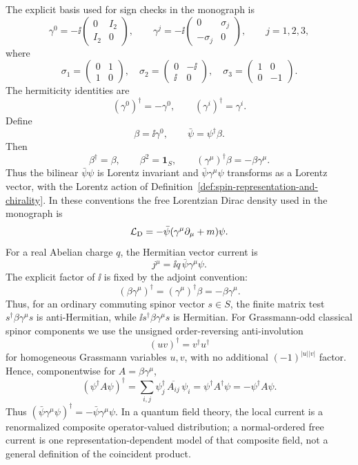 \begin{definition}
The explicit basis used for sign checks in the monograph is
\begin{equation}
  \gamma^0
  =
  -\ii
  \begin{pmatrix}
    0&I_2\\ I_2&0
  \end{pmatrix},
  \qquad
  \gamma^j
  =
  -\ii
  \begin{pmatrix}
    0&\sigma_j\\ -\sigma_j&0
  \end{pmatrix},
  \qquad j=1,2,3,
  \label{eq:appendix-weinberg-gamma-basis}
\end{equation}
where
\[
  \sigma_1=\begin{pmatrix}0&1\\1&0\end{pmatrix},
  \quad
  \sigma_2=\begin{pmatrix}0&-\ii\\ \ii&0\end{pmatrix},
  \quad
  \sigma_3=\begin{pmatrix}1&0\\0&-1\end{pmatrix}.
\]
The hermiticity identities are
\[
  (\gamma^0)^\dagger=-\gamma^0,
  \qquad
  (\gamma^i)^\dagger=\gamma^i .
\]
Define
\begin{equation}
  \beta=\ii\gamma^0,
  \qquad
  \bar\psi=\psi^\dagger\beta .
  \label{eq:appendix-dirac-adjoint}
\end{equation}
Then
\[
  \beta^\dagger=\beta,
  \qquad
  \beta^2=\mathbf 1_S,
  \qquad
  (\gamma^\mu)^\dagger\beta=-\beta\gamma^\mu .
\]
Thus the bilinear \(\bar\psi\psi\) is Lorentz invariant and
\(\bar\psi\gamma^\mu\psi\) transforms as a Lorentz vector, with the Lorentz
action of Definition~\ref{def:spin-representation-and-chirality}.  In these
conventions the free Lorentzian Dirac density used in the monograph is
\[
  \mathcal L_{\rm D}=-\bar\psi(\gamma^\mu\partial_\mu+m)\psi .
\]
For a real Abelian charge \(q\), the Hermitian vector current is
\[
  j^\mu=\ii q\,\bar\psi\gamma^\mu\psi .
\]
The explicit factor of \(\ii\) is fixed by the adjoint convention:
\[
  (\beta\gamma^\mu)^\dagger
  =
  (\gamma^\mu)^\dagger\beta
  =
  -\beta\gamma^\mu .
\]
Thus, for an ordinary commuting spinor vector \(s\in S\), the finite
matrix test \(s^\dagger\beta\gamma^\mu s\) is anti-Hermitian, while
\(\ii s^\dagger\beta\gamma^\mu s\) is Hermitian.  For Grassmann-odd
classical spinor components we use the unsigned order-reversing
anti-involution
\[
  (uv)^\dagger=v^\dagger u^\dagger
\]
for homogeneous Grassmann variables \(u,v\), with no additional
\((-1)^{|u||v|}\) factor.  Hence, componentwise for
\(A=\beta\gamma^\mu\),
\[
  (\psi^\dagger A\psi)^\dagger
  =
  \sum_{i,j}\psi_j^\dagger\,\overline{A_{ij}}\,\psi_i
  =
  \psi^\dagger A^\dagger\psi
  =
  -\psi^\dagger A\psi .
\]
Thus \((\bar\psi\gamma^\mu\psi)^\dagger=-\bar\psi\gamma^\mu\psi\).  In a
quantum field theory, the local current is a renormalized composite
operator-valued distribution; a normal-ordered free current is one
representation-dependent model of that composite field, not a general
definition of the coincident product.
\end{definition}

